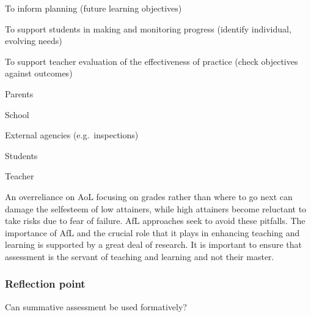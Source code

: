 \documentclass[letterpaper,10pt,english]{sphinxmanual}
\begin{document}
To inform planning (future learning objectives)

To support students in making and monitoring progress (identify individual, evolving needs)

To support teacher evaluation of the effectiveness of practice (check objectives against outcomes)














Parents

School

External agencies (e.g. inspections)





Students

Teacher









An over\sphinxhyphen{}reliance on AoL \textendash{} focusing on grades rather than where to go next \textendash{} can damage the self\sphinxhyphen{}esteem of low attainers, while high attainers become reluctant to take risks due to fear of failure. AfL approaches seek to avoid these pitfalls. The importance of AfL and the crucial role that it plays in enhancing teaching and learning is supported by a great deal of research. It is important to ensure that assessment is the servant of teaching and learning and not their master.


\subsubsection{Reflection point}
\label{\detokenize{content/session_00/Part_00_02:Reflection-point}}
Can summative assessment be used formatively?
\end{document}
